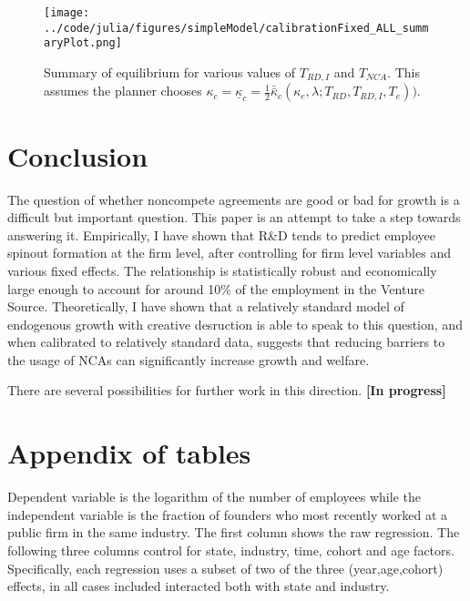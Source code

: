 \documentclass[11pt,english]{article}
\begin{document}
\begin{figure}[]
	\texttt{[image: ../code/julia/figures/simpleModel/calibrationFixed\_ALL\_summaryPlot.png]}
	\caption{Summary of equilibrium for various values of $T_{RD,I}$ and $T_{NCA}$. This assumes the planner chooses $\kappa_c = \underline{\kappa}_c = \frac{1}{2} \bar{\bar{\kappa}}_c(\kappa_e,\lambda;T_{RD},T_{RD,I},T_e))$.}
	\label{calibration_ALL_summaryPlot}
\end{figure}

\section{Conclusion}

The question of whether noncompete agreements are good or bad for growth is a difficult but important question. This paper is an attempt to take a step towards answering it. Empirically, I have shown that R\&D tends to predict employee spinout formation at the firm level, after controlling for firm level variables and various fixed effects. The relationship is statistically robust and economically large enough to account for around 10\% of the employment in the Venture Source. Theoretically, I have shown that a relatively standard model of endogenous growth with creative desruction is able to speak to this question, and when calibrated to relatively standard data, suggests that reducing barriers to the usage of NCAs can significantly increase growth and welfare.

There are several possibilities for further work in this direction. \textbf{[In progress]}



\appendix


\section{Appendix of tables}

\setcounter{table}{0}
\renewcommand{\thetable}{\Alph{section}\arabic{table}}



\begin{table}[!htb]
	\scriptsize
	\centering
	
	\caption{Dependent variable is the logarithm of the number of employees while the independent variable is the fraction of founders who most recently worked at a public firm in the same industry. The first column shows the raw regression. The following three columns control for state, industry, time, cohort and age factors. Specifically, each regression uses a subset of two of the three (year,age,cohort) effects, in all cases included interacted both with state and industry.} 
	\label{table:startupLifeCycle_founder2founders_lemployeecount_founder2}
\end{table}
\end{document}
